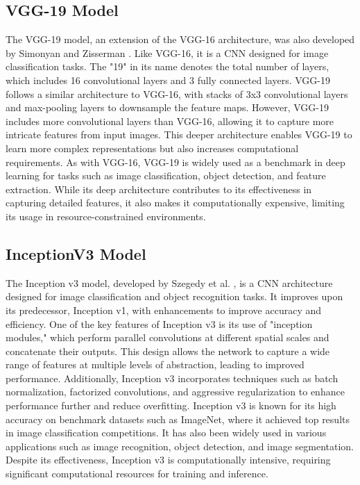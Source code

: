 \documentclass[10pt]{article}
\begin{document}
\subsection{VGG-19 Model}
The VGG-19 model, an extension of the VGG-16 architecture, was also developed by Simonyan and Zisserman \cite{Simonyan2015} \cite{Jain2020}. Like VGG-16, it is a CNN designed for image classification tasks. The "19" in its name denotes the total number of layers, which includes 16 convolutional layers and 3 fully connected layers. VGG-19 follows a similar architecture to VGG-16, with stacks of 3x3 convolutional layers and max-pooling layers to downsample the feature maps. However, VGG-19 includes more convolutional layers than VGG-16, allowing it to capture more intricate features from input images. This deeper architecture enables VGG-19 to learn more complex representations but also increases computational requirements. As with VGG-16, VGG-19 is widely used as a benchmark in deep learning for tasks such as image classification, object detection, and feature extraction. While its deep architecture contributes to its effectiveness in capturing detailed features, it also makes it computationally expensive, limiting its usage in resource-constrained environments.

\subsection{InceptionV3 Model}
The Inception v3 model, developed by Szegedy et al. \cite{Szegedy2016} \cite{Jain2020}, is a CNN architecture designed for image classification and object recognition tasks. It improves upon its predecessor, Inception v1, with enhancements to improve accuracy and efficiency. One of the key features of Inception v3 is its use of "inception modules," which perform parallel convolutions at different spatial scales and concatenate their outputs. This design allows the network to capture a wide range of features at multiple levels of abstraction, leading to improved performance. Additionally, Inception v3 incorporates techniques such as batch normalization, factorized convolutions, and aggressive regularization to enhance performance further and reduce overfitting. Inception v3 is known for its high accuracy on benchmark datasets such as ImageNet, where it achieved top results in image classification competitions. It has also been widely used in various applications such as image recognition, object detection, and image segmentation. Despite its effectiveness, Inception v3 is computationally intensive, requiring significant computational resources for training and inference.
\end{document}
